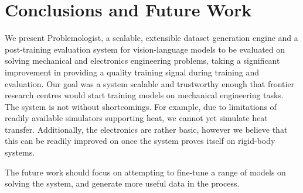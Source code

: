 \documentclass[conference]{IEEEtran}
\begin{document}
\section{Conclusions and Future Work}
We present Problemologist, a scalable, extensible dataset generation engine and a post-training evaluation system for vision-language models to be evaluated on solving mechanical and electronics engineering problems, taking a significant improvement in providing a quality training signal during training and evaluation. Our goal was a system scalable and trustworthy enough that frontier research centres would start training models on mechanical engineering tasks. The system is not without shortcomings. For example, due to limitations of readily available simulators supporting heat, we cannot yet simulate heat transfer. Additionally, the electronics are rather basic, however we believe that this can be readily improved on once the system proves itself on rigid-body systems.

The future work should focus on attempting to fine-tune a range of models on solving the system, and generate more useful data in the process.
\end{document}
